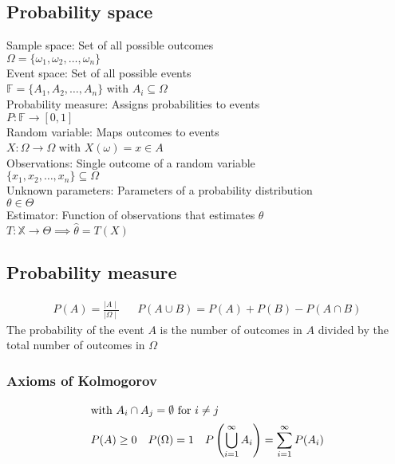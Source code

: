 \begin{mdframed}[style=eqbox]
\subsection{Probability space}
Sample space: Set of all possible outcomes\\
$\Omega = \{ \omega_1, \omega_2, \ldots, \omega_n \}$\\[0.25em]
Event space: Set of all possible events\\
$\mathbb{F} = \{ A_1, A_2, \ldots, A_n \}$ with $A_i \subseteq \Omega$\\[0.25em]
Probability measure: Assigns probabilities to events\\
$P : \mathbb{F} \rightarrow [0,1]$\\[0.25em]
Random variable: Maps outcomes to events\\
$X : \Omega \rightarrow \Omega$ with $X(\omega) = x \in A$\\[0.25em]
Observations: Single outcome of a random variable\\
$\{x_1, x_2, \ldots, x_n\} \subseteq \Omega$\\[0.25em]
Unknown parameters: Parameters of a probability distribution\\
$\theta \in \Theta$\\[0.25em]
Estimator: Function of observations that estimates $\theta$\\
$T: \mathbb{X} \rightarrow \Theta \implies \hat{\theta} = T(X)$
\end{mdframed}

\begin{mdframed}[style=eqbox]
  \subsection{Probability measure}
  \vspace*{-6pt}
  \begin{align*}
    P(A) = \frac{\mid A \mid}{\mid \Omega \mid} && P(A \cup B) = P(A) + P(B) - P(A \cap B)
  \end{align*}
  The probability of the event $A$ is the number of outcomes in $A$ divided by the total number of outcomes in $\Omega$
  \subsubsection{Axioms of Kolmogorov}
  \vspace*{-6pt}
  \begin{align*}
    \shortintertext{with $A_i \cap A_j = \emptyset$ for $i \neq j$}
    P(A) \geq 0 && P(\Omega) = 1 && P\left(\bigcup_{i=1}^{\infty} A_i\right) = \sum_{i=1}^{\infty} P(A_i)
  \end{align*}
\end{mdframed}


